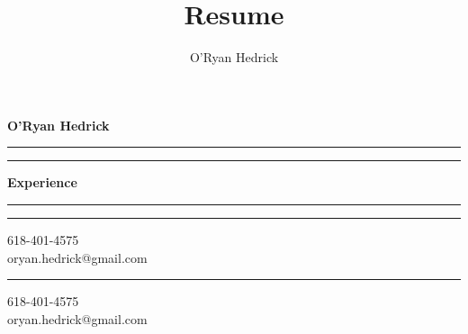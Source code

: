 \documentclass[letterpaper]{memoir}
\title{Resume}
\author{O'Ryan Hedrick}
\makeatletter
\newcommand{\footer}{
    \vfill
    \textcolor{dellblue}{\hrule}
    \begin{center}
    618-401-4575\\
    oryan.hedrick@gmail.com
    \end{center}
}
\newcommand{\header}[1]{\begin{center}\textcolor{dellblue}{\rule[.25em]{6em}{.4pt} \textbf{#1} \rule[.25em]{6em}{.4pt}}\end{center}}
\makeatother
\begin{document}
\begin{center}\Huge\textbf{O'Ryan Hedrick}\end{center}\normalsize
\textcolor{dellblue}{\hrule}

\header{Experience}

\vspace{2ex}

\vspace{2ex}

\footer
\newpage

\vspace{2ex}






\footer
\end{document}
